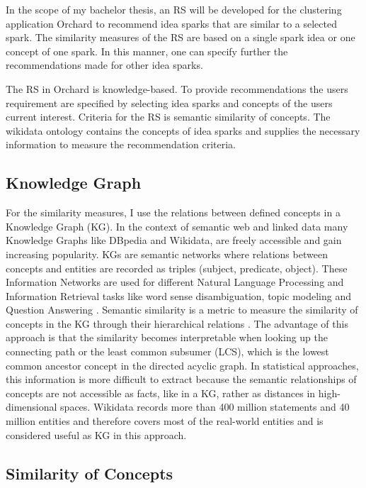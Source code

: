 \documentclass[pdftex,a4paper,12pt]{scrartcl}
\theoremstyle{definition}
\begin{document}
    In the scope of my bachelor thesis, an RS will be developed for the clustering application Orchard to recommend idea sparks that are similar to a selected spark. The similarity measures of the RS are based on a single spark idea or one concept of one spark. In this manner, one can specify further the recommendations made for other idea sparks. 

    The RS in Orchard is knowledge-based. To provide recommendations the users requirement are specified by selecting idea sparks and concepts of the users current interest. Criteria for the RS is semantic similarity of concepts. The wikidata ontology contains the concepts of idea sparks and supplies the necessary information to measure the recommendation criteria.

    
\subsection{Knowledge Graph}
    For the similarity measures, I use the relations between defined concepts in a Knowledge Graph (KG). In the context of semantic web and linked data many Knowledge Graphs like DBpedia and Wikidata, are freely accessible and gain increasing popularity. KGs are semantic networks where relations between concepts and entities are recorded as triples (subject, predicate, object). These Information Networks are used for different Natural Language Processing and Information Retrieval tasks like word sense disambiguation, topic modeling and Question Answering \citep{nastase_topic-driven_2008}. 
    Semantic similarity is a metric to measure the similarity of concepts in the KG through their hierarchical relations \citep{zhu_computing_2017}. The advantage of this approach is that the similarity becomes interpretable when looking up the connecting path or the least common subsumer (LCS), which is the lowest common ancestor concept in the directed acyclic graph. In statistical approaches, this information is more difficult to extract because the semantic relationships of concepts are not accessible as facts, like in a KG, rather as distances in high-dimensional spaces.
    Wikidata records more than 400 million statements and 40 million entities and therefore covers most of the real-world entities and is considered useful as KG in this approach. 

\subsection{Similarity of Concepts}
\end{document}

